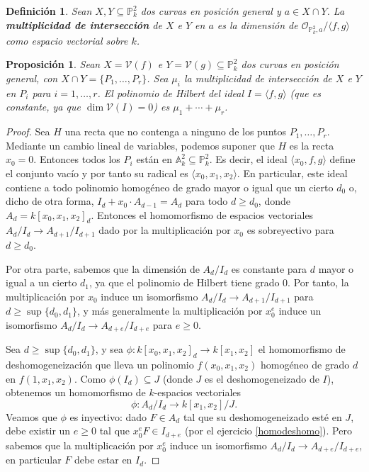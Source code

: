 \documentclass[a4paper,10pt]{book}
\newtheorem{prop}[thm]{Proposición}
\newtheorem{defn}[thm]{Definición}
\newcommand{\AAA}{\mathbb A}
\newcommand{\PP}{\mathbb P}
\newcommand{\VV}{{\mathcal V}}
\begin{document}
\begin{defn}
 Sean $X,Y\subseteq\PP^2_k$ dos curvas en posición general y $a\in X\cap Y$. La {\bf multiplicidad de intersección} de $X$ e $Y$ en $a$ es la dimensión de ${\mathcal O}_{\PP^2_k,a}/\langle f,g\rangle$ como espacio vectorial sobre $k$.
\end{defn}
 
\begin{prop}
 Sean $X=\VV(f)$ e $Y=\VV(g)\subseteq\PP^2_k$ dos curvas en posición general, con $X\cap Y=\{P_1,\ldots,P_r\}$. Sea $\mu_i$ la multiplicidad de intersección de $X$ e $Y$ en $P_i$ para $i=1,\ldots,r$. El polinomio de Hilbert del ideal $I=\langle f,g\rangle$ (que es constante, ya que $\dim\VV(I)=0$) es $\mu_1+\cdots+\mu_r$. 
\end{prop}

\begin{proof}
 Sea $H$ una recta que no contenga a ninguno de los puntos $P_1,\ldots,P_r$. Mediante un cambio lineal de variables, podemos suponer que $H$ es la recta $x_0=0$. Entonces todos los $P_i$ están en $\AAA^2_k\subseteq\PP^2_k$. Es decir, el ideal $\langle x_0,f,g \rangle$ define el conjunto vacío y por tanto su radical es $\langle x_0,x_1,x_2\rangle$. En particular, este ideal contiene a todo polinomio homogéneo de grado mayor o igual que un cierto $d_0$ o, dicho de otra forma, $I_d+x_0\cdot A_{d-1}=A_d$ para todo $d\geq d_0$, donde $A_d=k[x_0,x_1,x_2]_d$. Entonces el homomorfismo de espacios vectoriales $A_{d}/I_{d}\to A_{d+1}/I_{d+1}$ dado por la multiplicación por $x_0$ es sobreyectivo para $d\geq d_0$.

Por otra parte, sabemos que la dimensión de $A_d/I_d$ es constante para $d$ mayor o igual a un cierto $d_1$, ya que el polinomio de Hilbert tiene grado $0$. Por tanto, la multiplicación por $x_0$ induce un isomorfismo $A_{d}/I_{d}\to A_{d+1}/I_{d+1}$ para $d\geq\sup\{d_0,d_1\}$, y más generalmente la multiplicación por $x_0^e$ induce un isomorfismo $A_d/I_d\to A_{d+e}/I_{d+e}$ para $e\geq 0$.

Sea $d\geq\sup\{d_0,d_1\}$, y sea $\phi:k[x_0,x_1,x_2]_d\to k[x_1,x_2]$ el homomorfismo de deshomogeneización que lleva un polinomio $f(x_0,x_1,x_2)$ homogéneo de grado $d$ en $f(1,x_1,x_2)$. Como $\phi(I_d)\subseteq J$ (donde $J$ es el deshomogeneizado de $I$), obtenemos un homomorfismo de $k$-espacios vectoriales
$$
\phi:A_d/I_d\to k[x_1,x_2]/J.
$$
Veamos que $\phi$ es inyectivo: dado $F\in A_d$ tal que su deshomogeneizado esté en $J$, debe existir un $e\geq 0$ tal que $x_0^eF\in I_{d+e}$ (por el ejercicio \ref{homodeshomo}). Pero sabemos que la multiplicación por $x_0^e$ induce un isomorfismo $A_d/I_d\to A_{d+e}/I_{d+e}$, en particular $F$ debe estar en $I_d$.


\end{proof}
\end{document}
